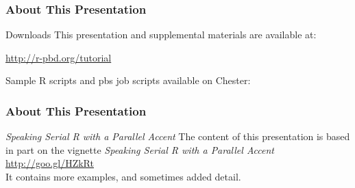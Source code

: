 \frame{
  \maketitle
}


\begin{frame}
\frametitle{About This Presentation}
 \begin{block}{Downloads}
  This presentation and supplemental materials are available at:
  \begin{center}
  \url{http://r-pbd.org/tutorial}
  \end{center}
  Sample R scripts and pbs job scripts available on Chester:\\
\centering{}
 \end{block}
\end{frame}


\begin{frame}
\frametitle{About This Presentation}
 \begin{block}{\emph{Speaking Serial R with a Parallel Accent}}
  The content of this presentation is based in part on the  
vignette \emph{Speaking Serial R with a Parallel Accent}\\[.4cm]
  \url{http://goo.gl/HZkRt}\\[.4cm]
  It contains more examples, and sometimes added detail.
 \end{block}
\end{frame}


